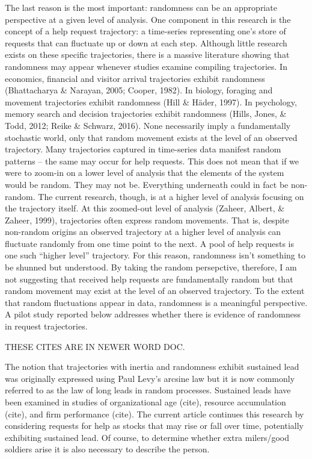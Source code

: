 \documentclass[english,,man]{apa6}
\begin{document}
The last reason is the most important: randomness can be an appropriate perspective at a given level of analysis. One component in this research is the concept of a help request trajectory: a time-series representing one's store of requests that can fluctuate up or down at each step. Although little research exists on these specific trajectories, there is a massive literature showing that randomness may appear whenever studies examine compiling trajectories. In economics, financial and visitor arrival trajectories exhibit randomness (Bhattacharya \& Narayan, 2005; Cooper, 1982). In biology, foraging and movement trajectories exhibit randomness (Hill \& Häder, 1997). In psychology, memory search and decision trajectories exhibit randomness (Hills, Jones, \& Todd, 2012; Reike \& Schwarz, 2016). None necessarily imply a fundamentally stochastic world, only that random movement exists at the level of an observed trajectory. Many trajectories captured in time-series data manifest random patterns -- the same may occur for help requests. This does not mean that if we were to zoom-in on a lower level of analysis that the elements of the system would be random. They may not be. Everything underneath could in fact be non-random. The current research, though, is at a higher level of analysis focusing on the trajectory itself. At this zoomed-out level of analysis (Zaheer, Albert, \& Zaheer, 1999), trajectories often express random movements. That is, despite non-random origins an observed trajectory at a higher level of analysis can fluctuate randomly from one time point to the next. A pool of help requests is one such \enquote{higher level} trajectory. For this reason, randomness isn't something to be shunned but understood. By taking the random persepctive, therefore, I am not suggesting that received help requests are fundamentally random but that random movement may exist at the level of an observed trajectory. To the extent that random fluctuations appear in data, randomness is a meaningful perspective. A pilot study reported below addresses whether there is evidence of randomness in request trajectories.

THESE CITES ARE IN NEWER WORD DOC.

The notion that trajectories with inertia and randomness exhibit sustained lead was originally expressed using Paul Levy's arcsine law but it is now commonly referred to as the law of long leads in random processes. Sustained leads have been examined in studies of organizational age (cite), resource accumulation (cite), and firm performance (cite). The current article continues this research by considering requests for help as stocks that may rise or fall over time, potentially exhibiting sustained lead. Of course, to determine whether extra milers/good soldiers arise it is also necessary to describe the person.
\end{document}
